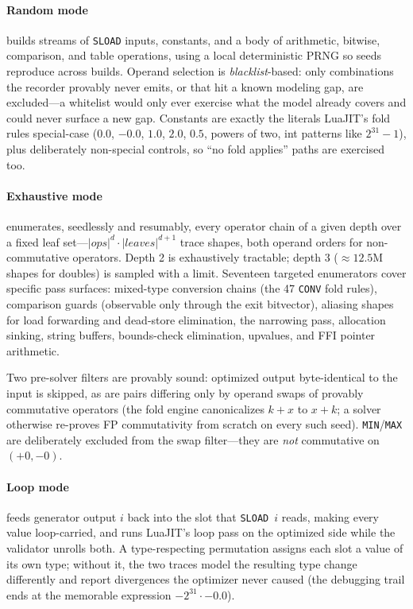 \documentclass[runningheads]{llncs}
\newif\iffull \fulltrue
\newcommand{\full}[1]{#1}
\newcommand{\brief}[1]{}
\newcommand{\full}[1]{}
\newcommand{\brief}[1]{#1}
\newcommand{\ir}[1]{\texttt{#1}}
\begin{document}
\paragraph{Random mode} builds streams of \ir{SLOAD} inputs, constants, and
a body of arithmetic, bitwise, comparison, and table operations, using a
local deterministic PRNG so seeds reproduce across builds. Operand selection
is \emph{blacklist}-based: only combinations the recorder provably never
emits, or that hit a known modeling gap, are excluded---a whitelist would
only ever exercise what the model already covers and could never surface a
new gap. Constants are exactly the literals LuaJIT's fold rules
special-case\full{ ($0.0$, $-0.0$, $1.0$, $2.0$, $0.5$, powers of two, int
patterns like $2^{31}{-}1$)}, plus\full{ deliberately} non-special
controls\full{, so ``no fold applies'' paths are exercised too}.

\paragraph{Exhaustive mode} enumerates\full{, seedlessly and resumably,}
every operator chain of a given depth over a fixed leaf set\full{---$|ops|^{d}
\cdot |\mathit{leaves}|^{d+1}$ trace shapes, both operand orders for
non-commutative operators. Depth 2 is exhaustively tractable; depth 3
(${\approx}12.5$M shapes for doubles) is sampled with a limit}. Seventeen
targeted enumerators cover specific pass surfaces:
\full{mixed-type conversion chains (the 47 \ir{CONV} fold rules),
comparison guards (observable only through the exit bitvector), aliasing
shapes for load forwarding and dead-store elimination, the narrowing pass,
allocation sinking, string buffers, bounds-check elimination, upvalues, and
FFI pointer arithmetic.}%
\brief{conversion chains, guards, aliasing, narrowing, sinking, buffers,
bounds checks, upvalues, FFI pointers.}

\iffull
Two pre-solver filters are provably sound: optimized output byte-identical
to the input is skipped, as are pairs differing only by operand swaps of
provably commutative operators (the fold engine canonicalizes $k+x$ to
$x+k$; a solver otherwise re-proves FP commutativity from scratch on every
such seed). \ir{MIN}/\ir{MAX} are deliberately excluded from the swap
filter---they are \emph{not} commutative on $(+0,-0)$.
\fi

\paragraph{Loop mode} feeds generator output $i$ back into the slot that
\ir{SLOAD}~$i$ reads, making every value loop-carried, and runs LuaJIT's
loop pass on the optimized side\full{ while the validator unrolls both. A
type-respecting permutation assigns each slot a value of its own type;
without it, the two traces model the resulting type change differently and
report divergences the optimizer never caused (the debugging trail ends at
the memorable expression $-2^{31} \cdot -0.0$)}.
\end{document}
